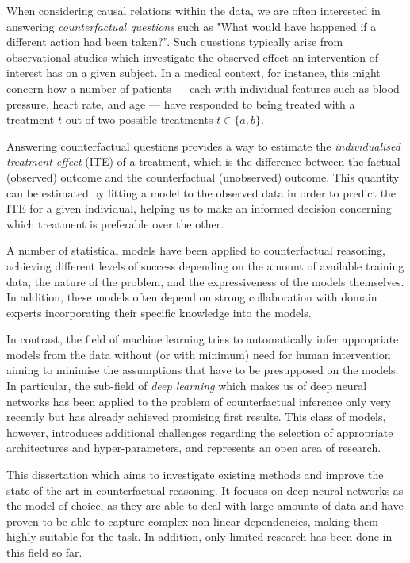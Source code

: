 When considering causal relations within the data, we are often interested in answering \emph{counterfactual questions} such as "What would have happened if a different action had been taken?”. Such questions typically arise from observational studies which investigate the observed effect an intervention of interest has on a given subject. In a medical context, for instance, this might concern how a number of patients — each with individual features such as blood pressure, heart rate, and age — have responded to being treated with a treatment $t$ out of two possible treatments $t \in \{a, b\}$.

Answering counterfactual questions provides a way to estimate the \emph{individualised treatment effect} (ITE) of a treatment, which is the difference between the factual (observed) outcome and the counterfactual (unobserved) outcome. This quantity can be estimated by fitting a model to the observed data in order to predict the ITE for a given individual, helping us to make an informed decision concerning which treatment is preferable over the other.

A number of statistical models have been applied to counterfactual reasoning, achieving different levels of success depending on the amount of available training data, the nature of the problem, and the expressiveness of the models themselves. In addition, these models often depend on strong collaboration with domain experts incorporating their specific knowledge into the models. 


In contrast, the field of machine learning tries to automatically infer appropriate models from the data without (or with minimum) need for human intervention aiming to minimise the assumptions that have to be presupposed on the models. In particular, the sub-field of \emph{deep learning} which makes us of deep neural networks has been applied to the problem of counterfactual inference only very recently but has already achieved promising first results. This class of models, however, introduces additional challenges regarding the selection of appropriate architectures and hyper-parameters, and represents an open area of research.  

This dissertation which aims to investigate existing methods and improve the state-of-the art in counterfactual reasoning. It focuses on deep neural networks as the model of choice, as they are able to deal with large amounts of data and have proven to be able to capture complex non-linear dependencies, making them highly suitable for the task. In addition, only limited research has been done in this field so far.


